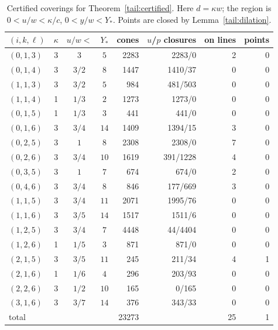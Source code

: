 \begin{table}[ht]\centering\small
\begin{tabular}{lcccrrrr}
\toprule
\((i,k,\ell)\) & \(\kappa\) & \(u/w<\) & \(Y_*\) & cones & \(u\)/\(p\) closures & on lines & points\\
\midrule
\((0,1,3)\) & 3 & \(3\) & \(5\) & 2283 & 2283/0 & 2 & 0\\
\((0,1,4)\) & 3 & \(3/2\) & \(8\) & 1447 & 1410/37 & 0 & 0\\
\((1,1,3)\) & 3 & \(3/2\) & \(5\) & 984 & 481/503 & 0 & 0\\
\((1,1,4)\) & 1 & \(1/3\) & \(2\) & 1273 & 1273/0 & 0 & 0\\
\((0,1,5)\) & 1 & \(1/3\) & \(3\) & 441 & 441/0 & 0 & 0\\
\((0,1,6)\) & 3 & \(3/4\) & \(14\) & 1409 & 1394/15 & 3 & 0\\
\((0,2,5)\) & 3 & \(1\) & \(8\) & 2308 & 2308/0 & 7 & 0\\
\((0,2,6)\) & 3 & \(3/4\) & \(10\) & 1619 & 391/1228 & 4 & 0\\
\((0,3,5)\) & 3 & \(1\) & \(7\) & 674 & 674/0 & 2 & 0\\
\((0,4,6)\) & 3 & \(3/4\) & \(8\) & 846 & 177/669 & 3 & 0\\
\((1,1,5)\) & 3 & \(3/4\) & \(11\) & 2071 & 1995/76 & 0 & 0\\
\((1,1,6)\) & 3 & \(3/5\) & \(14\) & 1517 & 1511/6 & 0 & 0\\
\((1,2,5)\) & 3 & \(3/4\) & \(7\) & 4448 & 44/4404 & 0 & 0\\
\((1,2,6)\) & 1 & \(1/5\) & \(3\) & 871 & 871/0 & 0 & 0\\
\((2,1,5)\) & 3 & \(3/5\) & \(11\) & 245 & 211/34 & 4 & 1\\
\((2,1,6)\) & 1 & \(1/6\) & \(4\) & 296 & 203/93 & 0 & 0\\
\((2,2,6)\) & 3 & \(1/2\) & \(10\) & 165 & 0/165 & 0 & 0\\
\((3,1,6)\) & 3 & \(3/7\) & \(14\) & 376 & 343/33 & 0 & 0\\
\midrule
total & & & & 23273 & & 25 & 1\\
\bottomrule
\end{tabular}
\caption{Certified coverings for Theorem~\ref{tail:certified}. Here \(d=\kappa w\); the region is \(0<u/w<\kappa/c\), \(0<y/w<Y_*\). Points are closed by Lemma~\ref{tail:dilation}.}\label{tab:cert}
\end{table}


